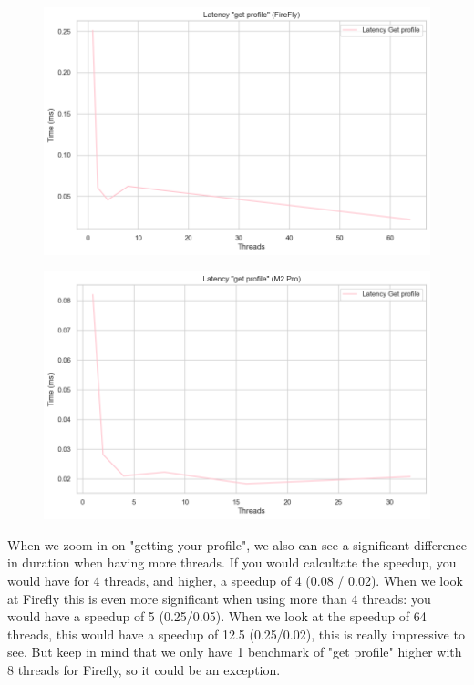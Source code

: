 \documentclass[a4paper]{article}
\begin{document}
\begin{figure}[H]
	\centering
	\includegraphics[width = \linewidth]{Images/LatencyProfileFirefly.png}
	\caption{}
\end{figure}
\begin{figure}[H]
	\centering
	\includegraphics[width = \linewidth]{Images/LatencyProfile.png}
	\caption{}
\end{figure}
When we zoom in on "getting your profile", we also can see a significant difference in duration when having more threads. If you would calcultate the speedup, you would have for 4 threads, and higher, a speedup of 4 (0.08 / 0.02). When we look at Firefly this is even more significant when using more than 4 threads: you would have a speedup of 5 (0.25/0.05). When we look at the speedup of 64 threads, this would have a speedup of 12.5 (0.25/0.02), this is really impressive to see. But keep in mind that we only have 1 benchmark of "get profile" higher with 8 threads for Firefly, so it could be an exception.
\end{document}
